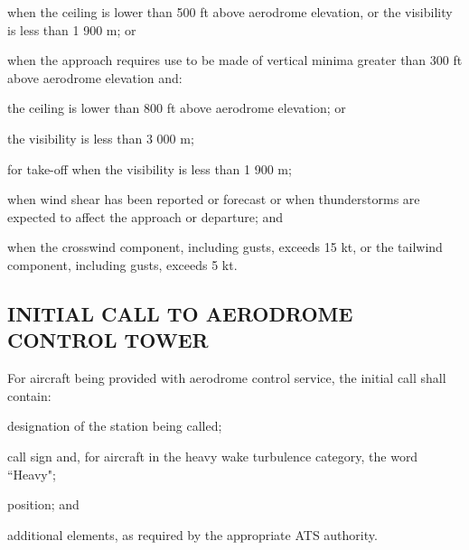 \begin{enumnoss}
\begin{enumalph}
        \begin{enumarab}
            \item when the ceiling is lower than 500 ft above aerodrome elevation, or the visibility is less than 1 900 m; or
            \item when the approach requires use to be made of vertical minima greater than 300 ft above aerodrome elevation and:

            \begin{enumroman}
                \item the ceiling is lower than 800 ft above aerodrome elevation; or
                \item the visibility is less than 3 000 m;
            \end{enumroman}
        \end{enumarab}

        \item for take-off when the visibility is less than 1 900 m;
        \item when wind shear has been reported or forecast or when thunderstorms are expected to affect the approach or departure; and
        \item when the crosswind component, including gusts, exceeds 15 kt, or the tailwind component, including gusts, exceeds 5 kt.
    \end{enumalph}
\end{enumnoss}

\subsection[Initial call to aerodrome control tower]{INITIAL CALL TO AERODROME CONTROL TOWER}

For aircraft being provided with aerodrome control service, the initial call shall contain:

\begin{enumalph}
    \item designation of the station being called;
    \item call sign and, for aircraft in the heavy wake turbulence category, the word ``Heavy";
    \item position; and
    \item additional elements, as required by the appropriate ATS authority.
\end{enumalph}


